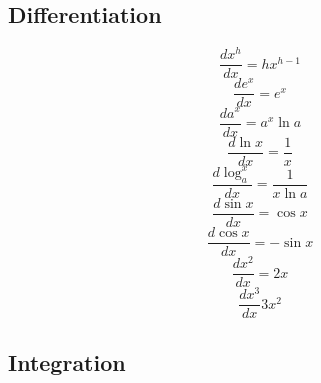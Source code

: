 	\subsection{Differentiation}
	
	\begin{equation}
	\frac{dx^h}{dx} = hx^{h-1}
	\end{equation}
	\begin{equation}
	\frac{de^x}{dx} = e^x
	\end{equation}
	\begin{equation}
	\frac{da^x}{dx} = a^x \ln a
	\end{equation}
	\begin{equation}
	\frac{d\ln x}{dx} = \frac{1}{x}
	\end{equation}
	\begin{equation}
	\frac{d\log_a^x}{dx} = \frac{1}{x\ln a}
	\end{equation}
	\begin{equation}
	\frac{d\sin x}{dx} = \cos x
	\end{equation}
	\begin{equation}
	\frac{d\cos x}{dx} = -\sin x
	\end{equation}
	\begin{equation}
	\frac{dx^2}{dx} = 2x
	\end{equation}
	\begin{equation}
	\frac{dx^3}{dx} 3x^2
	\end{equation}
	
	\subsection{Integration}
	
